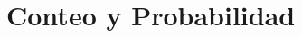 \documentclass[12pt,a4paper,twoside]{book}
\begin{document}
	
	
	
	\chapter{Conteo y Probabilidad}
	
	
	
	
	
	
\end{document}
